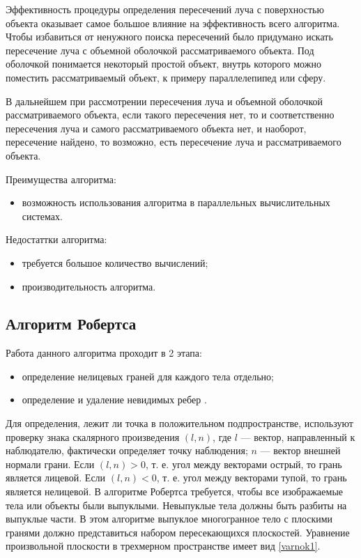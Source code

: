 Эффективность процедуры определения пересечений луча с поверхностью объекта оказывает самое большое влияние на эффективность всего алгоритма. Чтобы избавиться от ненужного поиска пересечений было придумано искать пересечение луча с объемной оболочкой рассматриваемого объекта. Под оболочкой понимается некоторый простой объект, внутрь которого можно поместить рассматриваемый объект, к примеру параллелепипед или сферу. 

В дальнейшем при рассмотрении пересечения луча и объемной оболочкой рассматриваемого объекта, если такого пересечения нет, то и соответственно пересечения луча и самого рассматриваемого объекта нет, и наоборот, пересечение найдено, то возможно, есть пересечение луча и рассматриваемого объекта. 

Преимущества алгоритма:
\begin{itemize}
	\item возможность использования алгоритма в параллельных вычислительных системах.
\end{itemize}

Недостаттки алгоритма:
\begin{itemize}
	\item требуется большое количество вычислений;
	\item производительность алгоритма.
\end{itemize}

\subsection{Алгоритм Робертса}

Работа данного алгоритма проходит в 2 этапа:
\begin{itemize}
	\item определение нелицевых граней для каждого тела отдельно;
	\item определение и удаление невидимых ребер \cite{demin}.
\end{itemize}


Для определения, лежит ли точка в положительном подпространстве, используют проверку знака скалярного произведения $(l, n)$, где $l$ --- вектор, направленный к наблюдателю, фактически определяет точку наблюдения; $n$ --- вектор внешней нормали грани. Если $(l, n) > 0$, т. е. угол между векторами острый, то грань является лицевой. Если $(l, n) < 0$, т. е. угол между векторами тупой, то грань является нелицевой.
В алгоритме Робертса требуется, чтобы все изображаемые тела или объекты были выпуклыми. Невыпуклые тела должны быть разбиты на выпуклые части. В этом алгоритме выпуклое многогранное тело с плоскими гранями должно представиться набором пересекающихся плоскостей. Уравнение произвольной плоскости в трехмерном пространстве имеет вид \ref{varnok1}.

